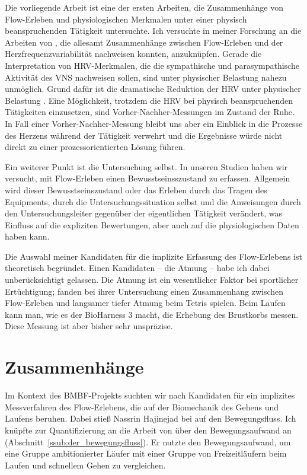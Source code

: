 Die vorliegende Arbeit ist eine der ersten Arbeiten, die Zusammenhänge von Flow-Erleben und physiologischen Merkmalen unter einer physisch beanspruchenden Tätigkeit untersuchte. Ich versuchte in meiner Forschung an die Arbeiten von \citet{deManzano2010, Keller2011, Gaggioli2013, Peifer2014, Tozman2015, Harmat2015}, die allesamt Zusammenhänge zwischen Flow-Erleben und der Herzfrequenzvariabilität nachweisen konnten, anzuknüpfen. Gerade die Interpretation von \ac{HRV}-Merkmalen, die die sympathische und parasympathische Aktivität des \acs{VNS} nachweisen sollen, sind unter physischer Belastung nahezu unmöglich. Grund dafür ist die dramatische Reduktion der \ac{HRV} unter physischer Belastung \citep{Hoos2010}. Eine Möglichkeit, trotzdem die \ac{HRV} bei physisch beanspruchenden Tätigkeiten einzusetzen, sind Vorher-Nachher-Messungen im Zustand der Ruhe. In Fall einer Vorher-Nachher-Messung bleibt uns aber ein Einblick in die Prozesse des Herzens während der Tätigkeit verwehrt und die Ergebnisse würde nicht direkt zu einer prozessorientierten Lösung führen. 

Ein weiterer Punkt ist die Untersuchung selbst. In unseren Studien haben wir versucht, mit Flow-Erleben einen Bewusstseinsszustand zu erfassen. Allgemein wird dieser Bewusstseinszustand oder das Erleben durch das Tragen des Equipments, durch die Untersuchungssituation selbst und die Anweisungen durch den Untersuchungsleiter gegenüber der eigentlichen Tätigkeit verändert, was Einfluss auf die expliziten Bewertungen, aber auch auf die physiologischen Daten haben kann.

Die Auswahl meiner Kandidaten für die implizite Erfassung des Flow-Erlebens ist theoretisch begründet. Einen Kandidaten -- die Atmung -- habe ich dabei unberücksichtigt gelassen. Die Atmung ist ein wesentlicher Faktor bei sportlicher Ertüchtigung; \citet{Harmat2015} fanden bei ihrer Untersuchung einen Zusammenhang zwischen Flow-Erleben und langsamer tiefer Atmung beim Tetris spielen. Beim Laufen kann man, wie es der BioHarness 3 macht, die Erhebung des Brustkorbs messen. Diese Messung ist aber bisher sehr unspräzise. 

\section{Zusammenhänge} 

\label{sec:zusammenhange}

Im Kontext des \acs{BMBF}-Projekts suchten wir nach Kandidaten für ein implizites Messverfahren des Flow-Erlebens, die auf der Biomechanik des Gehens und Laufens beruhen. Dabei stieß Nassrin Hajinejad bei \citet[][S.~121]{Meinel2007} auf den Bewegungsfluss.  Ich knüpfte zur Quantifizierung an die Arbeit von \citet{Hreljac2000} über den Bewegungsaufwand an (Abschnitt~\ref{ssub:der_bewegungsfluss}). Er nutzte den Bewegungsaufwand, um eine Gruppe ambitionierter Läufer mit einer Gruppe von Freizeitläufern beim Laufen und schnellem Gehen zu vergleichen. 

